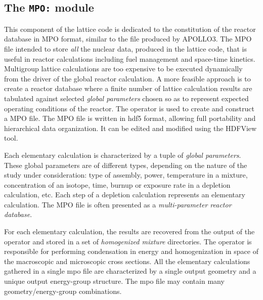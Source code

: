 \subsection{The {\tt MPO:} module}\label{sect:MPOData}

This component of the lattice code is dedicated to the constitution of the
reactor database in MPO format, similar to the file produced by APOLLO3.\cite{Apollo3}
The MPO file intended to store {\sl all} the nuclear data, produced in
the lattice code, that is useful
in reactor calculations including fuel management and space-time kinetics.
Multigroup lattice calculations are too expensive to be executed dynamically
from the driver of the global reactor calculation. A more feasible
approach is to create a reactor database where a finite number of lattice
calculation results are tabulated against selected {\sl global parameters}
chosen so as to represent expected operating conditions of the reactor. The
 operator is used to create and construct a {\sc MPO} file.
The MPO file is written in {\sc hdf5} format, allowing full portability and hierarchical
data organization. It can be edited and modified using the HDFView tool.

\vskip 0.1cm

Each elementary calculation is characterized by a tuple of {\sl global parameters}.
These global parameters are of different types, depending on the nature of the
study under consideration: type of assembly, power, temperature in a mixture,
concentration of an isotope, time, burnup or exposure rate in a depletion calculation,
etc. Each step of a depletion calculation represents an elementary calculation.
The {\sc MPO} file is often presented as a {\sl multi-parameter reactor database}.

\vskip 0.1cm

For each elementary calculation, the results are recovered from the output of the
 operator and stored in a set of {\sl homogenized mixture}
directories. The  operator is responsible for performing condensation
in energy and homogenization in space of the macroscopic and microscopic cross
sections. All the elementary calculations gathered in a single {\sc mpo} file are
characterized by a single output geometry and a unique output energy-group
structure. The {\sc mpo} file may contain many geometry/energy-group combinations.

\vskip 0.1cm

